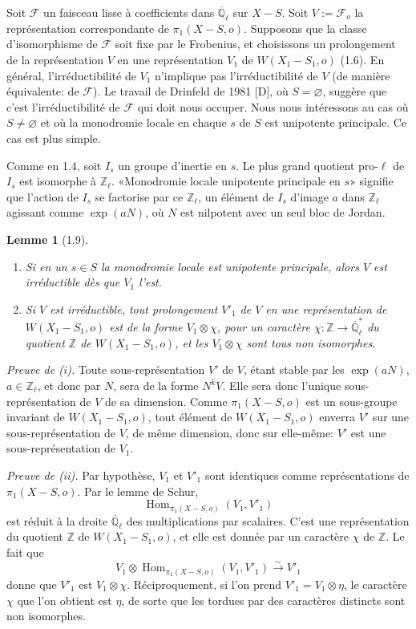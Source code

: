 \documentclass[10pt]{article}
\newcommand{\Ql}{\overline{\mathbb Q}_{\ell}}
\newcommand{\Zl}{\mathbb Z_{\ell}}
\newcommand{\Hom}{\operatorname{Hom}}
\theoremstyle{deligne}
\newtheorem*{lemma*}{Lemme}
\newcommand{\heading}[1]{\vspace{0.7em}\noindent{\bfseries #1}\quad}
\begin{document}
\heading{1.8.} Soit $\mathcal F$ un faisceau lisse à coefficients dans $\Ql$ sur $X-S$. Soit $V:=\mathcal F_o$ la représentation correspondante de $\pi_1(X-S,o)$. Supposons que la classe d'isomorphisme de $\mathcal F$ soit fixe par le Frobenius, et choisissons un prolongement de la représentation $V$ en une représentation $V_1$ de $W(X_1-S_1,o)$ (1.6). En général, l'irréductibilité de $V_1$ n'implique pas l'irréductibilité de $V$ (de manière équivalente: de $\mathcal F$). Le travail de Drinfeld de 1981 [D], où $S=\varnothing$, suggère que c'est l'irréductibilité de $\mathcal F$ qui doit nous occuper. Nous nous intéressons au cas où $S\ne\varnothing$ et où la monodromie locale en chaque $s$ de $S$ est unipotente principale. Ce cas est plus simple.

Comme en 1.4, soit $I_s$ un groupe d'inertie en $s$. Le plus grand quotient pro-$\ell$ de $I_s$ est isomorphe à $\Zl$. «Monodromie locale unipotente principale en $s$» signifie que l'action de $I_s$ se factorise par ce $\Zl$, un élément de $I_s$ d'image $a$ dans $\Zl$ agissant comme $\exp(aN)$, où $N$ est nilpotent avec un seul bloc de Jordan.

\begin{lemma*}[1.9]
\begin{enumerate}[label=(\roman*)]
\item Si en un $s\in S$ la monodromie locale est unipotente principale, alors $V$ est irréductible dès que $V_1$ l'est.
\item Si $V$ est irréductible, tout prolongement $V'_1$ de $V$ en une représentation de $W(X_1-S_1,o)$ est de la forme $V_1\otimes\chi$, pour un caractère $\chi:\mathbb Z\to\Ql^*$ du quotient $\mathbb Z$ de $W(X_1-S_1,o)$, et les $V_1\otimes\chi$ sont tous non isomorphes.
\end{enumerate}
\end{lemma*}

\textit{Preuve de (i).} Toute sous-représentation $V'$ de $V$, étant stable par les $\exp(aN)$, $a\in\Zl$, et donc par $N$, sera de la forme $N^kV$. Elle sera donc l'unique sous-représentation de $V$ de sa dimension. Comme $\pi_1(X-S,o)$ est un sous-groupe invariant de $W(X_1-S_1,o)$, tout élément de $W(X_1-S_1,o)$ enverra $V'$ sur une sous-représentation de $V$, de même dimension, donc sur elle-même: $V'$ est une sous-représentation de $V_1$.

\textit{Preuve de (ii).} Par hypothèse, $V_1$ et $V'_1$ sont identiques comme représentations de $\pi_1(X-S,o)$. Par le lemme de Schur,
\[
 \Hom_{\pi_1(X-S,o)}(V_1,V'_1)
\]
est réduit à la droite $\Ql$ des multiplications par scalaires. C'est une représentation du quotient $\mathbb Z$ de $W(X_1-S_1,o)$, et elle est donnée par un caractère $\chi$ de $\mathbb Z$. Le fait que
\[
 V_1\otimes\Hom_{\pi_1(X-S,o)}(V_1,V'_1)
 \overset{\sim}{\longrightarrow}V'_1
\]
donne que $V'_1$ est $V_1\otimes\chi$. Réciproquement, si l'on prend $V'_1=V_1\otimes\eta$, le caractère $\chi$ que l'on obtient est $\eta$, de sorte que les tordues par des caractères distincts sont non isomorphes.
\end{document}
